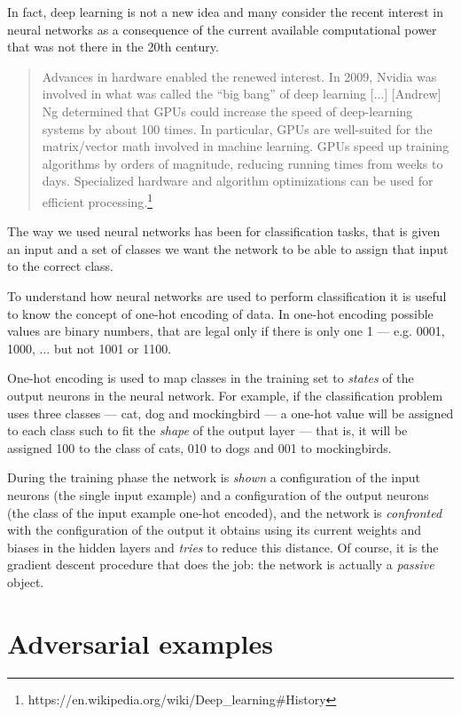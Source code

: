 In fact, deep learning is not a new idea and many consider the recent
interest in neural networks as a consequence of the current available
computational power that was not there in the 20th century.

\begin{quote}
  Advances in hardware enabled the renewed interest. In 2009, Nvidia
  was involved in what was called the ``big bang'' of deep learning
  [...] [Andrew] Ng determined that GPUs could increase the speed of
  deep-learning systems by about 100 times. In particular, GPUs are
  well-suited for the matrix/vector math involved in machine learning.
  GPUs speed up training algorithms by orders of magnitude, reducing
  running times from weeks to days. Specialized hardware and algorithm
  optimizations can be used for efficient
  processing.\footnote{https://en.wikipedia.org/wiki/Deep\_learning\#History}
\end{quote}

The way we used neural networks has been for classification tasks, that
is given an input and a set of classes we want the network to be able
to assign that input to the correct class.

To understand how neural networks are used to perform classification it
is useful to know the concept of one-hot encoding of data. In one-hot
encoding possible values are binary numbers, that are legal only if
there is only one 1 --- e.g. 0001, 1000, ... but not 1001 or 1100.

One-hot encoding is used to map classes
in the training set to \emph{states} of the output neurons in the
neural network. For example, if the classification problem uses three
classes --- cat, dog and mockingbird --- a one-hot value will be assigned to
each class such to fit the \emph{shape} of the output layer --- that
is, it will be assigned 100 to the class of cats, 010 to dogs and 001
to mockingbirds.

During the training phase the network is \emph{shown} a
configuration of the input neurons (the single input example) and a
configuration of the output neurons (the class of the input example
one-hot encoded), and the network is \emph{confronted} with the
configuration of the output it obtains using its current weights and biases
in the hidden layers and \emph{tries} to reduce this distance. Of
course, it is the gradient descent procedure that does the job: the
network is actually a \emph{passive} object.

\section{Adversarial examples}
\label{sec:adversarial-examples}

